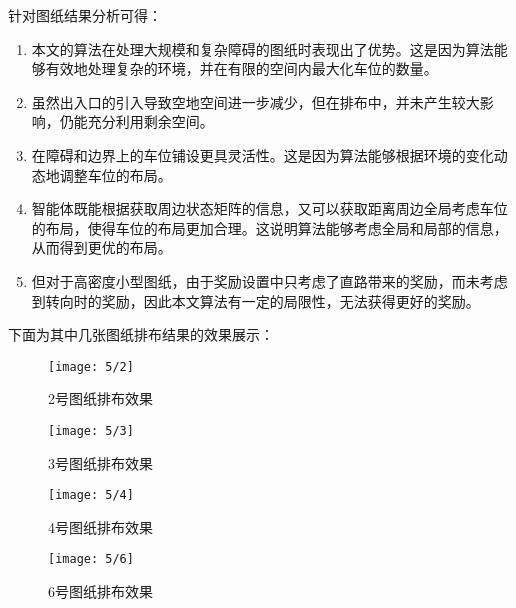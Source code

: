 针对图纸结果分析可得：
\begin{enumerate}
    \item 本文的算法在处理大规模和复杂障碍的图纸时表现出了优势。这是因为算法能够有效地处理复杂的环境，并在有限的空间内最大化车位的数量。
    \item 虽然出入口的引入导致空地空间进一步减少，但在排布中，并未产生较大影响，仍能充分利用剩余空间。
    \item 在障碍和边界上的车位铺设更具灵活性。这是因为算法能够根据环境的变化动态地调整车位的布局。
    \item 智能体既能根据获取周边状态矩阵的信息，又可以获取距离周边全局考虑车位的布局，使得车位的布局更加合理。这说明算法能够考虑全局和局部的信息，从而得到更优的布局。
    \item 但对于高密度小型图纸，由于奖励设置中只考虑了直路带来的奖励，而未考虑到转向时的奖励，因此本文算法有一定的局限性，无法获得更好的奖励。
\end{enumerate}

下面为其中几张图纸排布结果的效果展示：

\begin{figure}[!htb]
    \centering
    \texttt{[image: 5/2]}
    \caption{2号图纸排布效果}
\end{figure}

\begin{figure}[!htb]
    \centering
    \texttt{[image: 5/3]}
    \caption{3号图纸排布效果}
\end{figure}
\begin{figure}[!htb]
    \centering
    \texttt{[image: 5/4]}
    \caption{4号图纸排布效果}
\end{figure}

\begin{figure}[!htb]
    \centering
    \texttt{[image: 5/6]}
    \caption{6号图纸排布效果}
\end{figure}